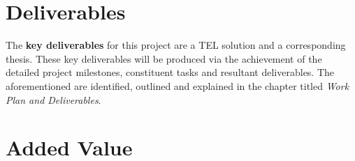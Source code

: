 \section{Deliverables}
\label{sec1:sec03}

The \textbf{key deliverables} for this project are a TEL solution and a corresponding thesis. These key deliverables will be produced via the achievement of the detailed project milestones, constituent tasks and resultant deliverables. The aforementioned are identified, outlined and explained in the chapter titled \textit{Work Plan and Deliverables}.

\newpage
\section{Added Value}
\label{sec:sec01}

